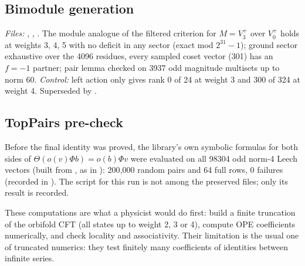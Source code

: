 \subsection{Bimodule generation}

\emph{Files:} , , . The
module analogue of the filtered criterion for $M=V_3^+$ over $V_0^+$ holds at weights 3, 4, 5 with
no deficit in any sector (exact mod $2^{31}-1$); ground sector exhaustive over the 4096 residues,
every sampled coset vector (301) has an $f=-1$ partner; pair lemma checked on 3937 odd magnitude
multisets up to norm 60. \emph{Control:} left action only gives rank 0 of 24 at weight 3 and 300 of
324 at weight 4. Superseded by .

\subsection{TopPairs pre-check}

Before the final identity was proved, the library's own symbolic formulas for both sides of
$\Theta(o(v)\Phi b)=o(b)\Phi v$ were evaluated on all 98304 odd norm-4 Leech vectors (built from
, as in ): 200{,}000 random pairs and 64 full rows, 0 failures (recorded
in ). The script for this run is not among
the preserved files; only its result is recorded.

\begin{physics}
These computations are what a physicist would do first: build a finite truncation of the
orbifold CFT (all states up to weight 2, 3 or 4), compute OPE coefficients numerically, and check
locality and associativity. Their limitation is the usual one of truncated numerics: they test
finitely many coefficients of identities between infinite series.
\end{physics}


